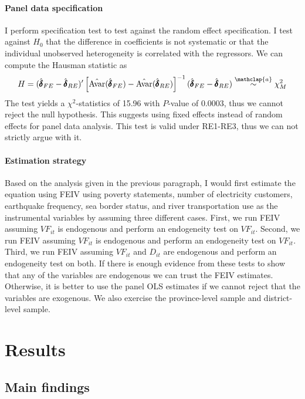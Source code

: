 \documentclass[letterpaper,12pt,leqno]{article}
\newcommand\asym{\stackrel{\mathclap{a}}{\sim}}
\newcommand{\Av}{\text{Avar}}
\begin{document}
\paragraph{Panel data specification} I perform \citet{hausman78} specification test to test against the random effect specification. I test against $H_0$ that the difference in coefficients is not systematic or that the individual unobserved heterogeneity is correlated with the regressors. We can compute the Hausman statistic as \begin{equation*}
        H=(\hat{\pmb{\delta}}_{FE}-\hat{\pmb{\delta}}_{RE})'\left[\hat{\Av}(\hat{\pmb{\delta}}_{FE})-\hat{\Av}(\hat{\pmb{\delta}}_{RE})\right]^{-1}(\hat{\pmb{\delta}}_{FE}-\hat{\pmb{\delta}}_{RE}) \asym \chi_M^2 \end{equation*}
The test yields a $\chi^2$-statistics of 15.96 with $P$-value of 0.0003, thus we cannot reject the null hypothesis. This suggests using fixed effects instead of random effects for panel data analysis. This test is valid under RE1-RE3, thus we can not strictly argue with it.

\paragraph{Estimation strategy} Based on the analysis given in the previous paragraph, I would first estimate the equation using FEIV using poverty statements, number of electricity customers, earthquake frequency, sea border status, and river transportation use as the instrumental variables by assuming three different cases. First, we run FEIV assuming $VF_{it}$ is endogenous and perform an endogeneity test on $VF_{it}$. Second, we run FEIV assuming $VF_{it}$ is endogenous and perform an endogeneity test on $VF_{it}$. Third, we run FEIV assuming $VF_{it}$ and $D_{it}$ are endogenous and perform an endogeneity test on both. If there is enough evidence from these tests to show that any of the variables are endogenous we can trust the FEIV estimates. Otherwise, it is better to use the panel OLS estimates if we cannot reject that the variables are exogenous. We also exercise the province-level sample and district-level sample.

\section{Results}\label{s:result}
\subsection{Main findings}\label{ss:findings}
\end{document}
